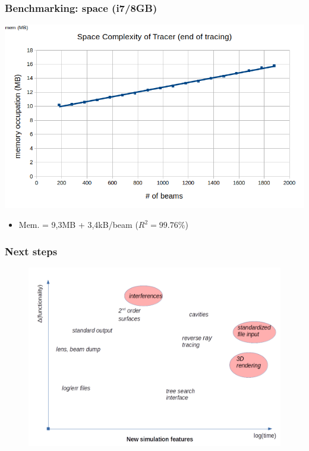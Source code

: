 \documentclass{beamer}
\begin{document}
\begin{frame}
\frametitle{Benchmarking: space (i7/8GB)}

\begin{center}
\includegraphics[scale = .45]{spacecomplexity.png}
\end{center}


\begin{itemize}
\item Mem. = 9,3MB + 3,4kB/beam ($R^2 = 99.76$\%)
\end{itemize}
\end{frame}

\begin{frame}
\frametitle{Next steps}
\begin{figure}
\begin{center}
\includegraphics[scale=0.36]{newfeatures}

\end{center}
\end{figure}
\end{frame}
\end{document}
